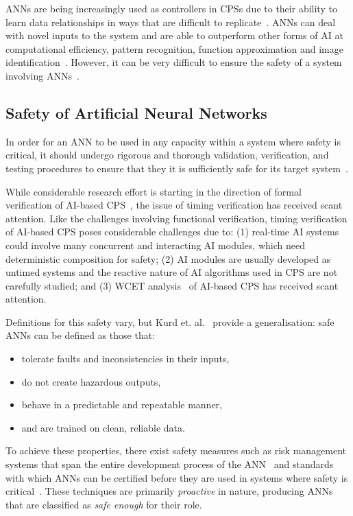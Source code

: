 \acp{ANN} are being increasingly used as controllers in \acp{CPS} due to their ability to learn data relationships in ways that are difficult to replicate~\cite{ANNSafety2007}. 
\acp{ANN} can deal with novel inputs to the system and are able to outperform other forms of \ac{AI} at computational efficiency, pattern recognition, function approximation and image identification~\cite{AIComp2016, AIComp2017}. 
However, it can be very difficult to ensure the safety of a system involving \acp{ANN}~\cite{ANNSafety2007, ANNSafety2018}.

\subsection{Safety of Artificial Neural Networks}
In order for an \ac{ANN} to be used in any capacity within a system where safety is critical, it should undergo rigorous and thorough validation, verification, and testing procedures to ensure that they it is sufficiently safe for its target system~\cite{scann, ANNSafetyLifecycle2003}. 

While considerable research effort is starting in the direction of formal verification of \ac{AI}-based \ac{CPS}~\cite{seshia2016towards, russell2015}, the issue of timing verification has received scant attention. 
Like the challenges involving functional verification, timing verification of AI-based  \ac{CPS} poses considerable challenges due to: (1) real-time \ac{AI} systems could involve many concurrent and interacting \ac{AI} modules, which need deterministic composition for safety; (2) \ac{AI} modules are usually developed as untimed systems and the reactive nature of AI algorithms used in CPS are not carefully studied; and (3) \acf{WCET} analysis~\cite{wilhelm2008worst} of \ac{AI}-based \ac{CPS} has received scant attention.

Definitions for this safety vary, but Kurd et. al.~\cite{EstSafeCriteria2003} provide a generalisation: safe \acp{ANN} can be defined as those that:
\begin{itemize}
	\item tolerate faults and inconsistencies in their inputs,
	\item do not create hazardous outputs,
	\item behave in a predictable and repeatable manner,
	\item and are trained on clean, reliable data. 
\end{itemize}

To achieve these properties, there exist safety measures such as risk management systems that span the entire development process of the \ac{ANN}~\cite{ANNDevModel1999} and standards with which \acp{ANN} can be certified before they are used in systems where safety is critical~\cite{SCANNStandard}. 
These techniques are primarily \textit{proactive} in nature, producing \acp{ANN} that are classified as \textit{safe enough} for their role. 

